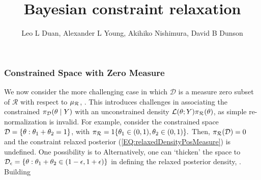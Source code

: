 \documentclass[10pt,fleqn]{article}
\title{\textbf{Bayesian constraint relaxation}}
\author{Leo L Duan, Alexander L Young, Akihiko Nishimura, David B Dunson}
\date{}
\newcommand{\leo}[1]{{\color{blue}{#1}}}
\DeclareMathOperator{\1}{\mathbbm{1}} \DeclareMathOperator{\bigO}{\mc O}
\begin{document}
\subsubsection{Constrained Space with Zero Measure}
\label{SEC:Zero_Measure_Methods}

We now consider the more challenging case in which $\mathcal{D}$ is a measure
zero subset of $\mathcal{R}$ with respect to $\mu_{\mathcal{R}}$, \leo{the Lesbesgue
measure}. This introduces challenges in associating the constrained $\pi_{\mathcal{D}}(\theta \mid Y)$ with an unconstrained density $\mathcal{L}(\theta; Y)\pi_{\mathcal{R}}(\theta)$, as simple re-normalization is invalid. For example, consider the
constrained space $\mathcal{D} = \{\theta: \theta_1+\theta_2=1\}$, with $\pi_{\mathcal{R}} =
1\{\theta_1 \in (0,1),\theta_2 \in (0,1)\}.$ Then, $\pi_{\mathcal{R}}(\mathcal{D})=0$ and
the constraint relaxed posterior (\ref{EQ:relaxedDensityPosMeasure}) is
undefined. One possibility is to \leo{focus on lower dimension by replacing
  $(\theta_1,\theta_2)$
  with $(\theta_1,1-\theta_1)$, deriving the appropriate density.
}
Alternatively, one can `thicken' the
space to $\mathcal{D}_{\epsilon} = \{\theta: \theta_1+\theta_2\in
(1-\epsilon,1+\epsilon)\}$ in defining the relaxed posterior density,
\leo{without having to focus on lower dimension}. Building
\end{document}
